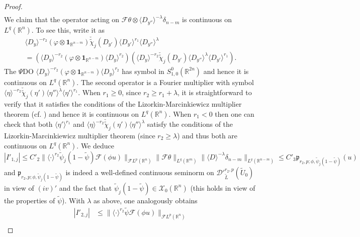 \documentclass[12pt,reqno]{amsart}
\newcommand{\RR}{\mathbb R}
\newcommand{\DD}{\mathcal D}
\newcommand{\XX}{\mathcal X}
\theoremstyle{plain}
\theoremstyle{remark}
\theoremstyle{definition}
\numberwithin{equation}{section}
\begin{document}
\begin{proof}
\begin{align}
\end{align}
We claim that the operator acting on $\mathcal{F}\theta\otimes\langle D_{y''}\rangle^{-\lambda}\delta_{n-m}$ is continuous on $L^q(\RR^n)$. To see this, write it as
\begin{multline*}
\langle D_y\rangle^{-r_2}(\varphi\otimes\mathbf{1}_{\RR^{n-m}})\check{\widetilde{\chi}}_j(D_{y'})\langle D_{y'}\rangle^{r_1}\langle D_{y''}\rangle^{\lambda}\\
=\left(\langle D_y\rangle^{-r_2}(\varphi\otimes\mathbf{1}_{\RR^{n-m}})\langle D_y\rangle^{r_2}\right)\left(\langle D_y\rangle^{-r_2}\check{\widetilde{\chi}}_j(D_{y'})\langle D_{y''}\rangle^{\lambda}\langle D_{y'}\rangle^{r_1}\right).
\end{multline*}
The $\Psi$DO $\langle D_y\rangle^{-r_2}(\varphi\otimes\mathbf{1}_{\RR^{n-m}})\langle D_y\rangle^{r_2}$ has symbol in $S^0_{1,0}(\RR^{2n})$ and hence it is continuous on $L^q(\RR^n)$. The second operator is a Fourier multiplier with symbol $\langle \eta\rangle^{-r_2}\check{\widetilde{\chi}}_j(\eta')\langle \eta''\rangle^{\lambda}\langle \eta'\rangle^{r_1}$. When $r_1\geq 0$, since $r_2\geq r_1+\lambda$, it is straightforward to verify that it satisfies the conditions of the Lizorkin-Marcinkiewicz multiplier theorem \cite[Corollary 6.2.5, p. 444]{Grafakos} (cf. \cite[Theorem 6.2.4, p. 441]{Grafakos}) and hence it is continuous on $L^q(\RR^n)$. When $r_1<0$ then one can check that both $\langle \eta'\rangle^{r_1}$ and $\langle \eta\rangle^{-r_2}\check{\widetilde{\chi}}_j(\eta')\langle \eta''\rangle^{\lambda}$ satisfy the conditions of the Lizorkin-Marcinkiewicz multiplier theorem (since $r_2\geq \lambda$) and thus both are continuous on $L^q(\RR^n)$. We deduce
\begin{equation*}
|I'_{1,j}|\leq C'_2\|\langle\cdot\rangle^{r_2}\widetilde{\psi}_j(1-\widetilde{\psi})\mathcal{F}(\phi u)\|_{\mathcal{F}L^p(\RR^n)}\|\mathcal{F}\theta\|_{L^q(\RR^m)}\|\langle D\rangle^{-\lambda}\delta_{n-m}\|_{L^q(\RR^{n-m})}\leq C'_3\mathfrak{p}_{r_2,p;\phi,\widetilde{\psi}_j(1-\widetilde{\psi})}(u)
\end{equation*}
and $\mathfrak{p}_{r_2,p;\phi,\widetilde{\psi}_j(1-\widetilde{\psi})}$ is indeed a well-defined continuous seminorm on $\DD'^{r_2,p}_{\widetilde{L}}(\widetilde{U}_0)$ in view of $(iv)'$ and the fact that $\widetilde{\psi}_j(1-\widetilde{\psi})\in\XX_0(\RR^n)$ (this holds in view of the properties of $\widetilde{\psi}$). With $\lambda$ as above, one analogously obtains
\begin{align*}
|I'_{2,j}|&\leq \|\langle\cdot\rangle^{r_2}\widetilde{\psi}\mathcal{F}(\phi u)\|_{\mathcal{F}L^p(\RR^n)}\\

\end{align*}
\end{proof}
\end{document}
